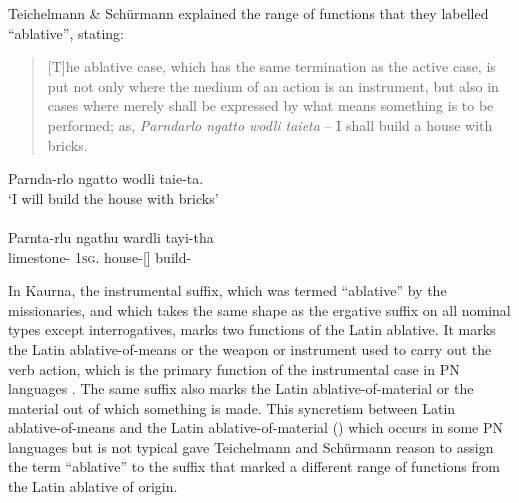 Teichelmann \& Schürmann explained the range of functions that they labelled “ablative”, stating: 

\begin{quote}
    [T]he ablative case, which has the same termination as the active case, is put not only where the medium of an action is an instrument, but also in cases where merely shall be expressed by what means something is to be performed; as, \textit{Parndarlo ngatto wodli taieta} – I shall build a house with bricks. \citep[24]{teichelmann_outlines_1840}
\end{quote}

\ea\label{ex:5:15}
Parnda-rlo 		ngatto 	  wodli                 taie-ta.  \\
`I will build the house with bricks' \\   	        
\citep[24]{teichelmann_outlines_1840} \\
\gll Parnta-rlu  		 ngathu     wardli              tayi-tha \\
limestone-   	1\textsc{sg}.   house-[]   build-                               \\
\z
      	         

      	         
In Kaurna, the instrumental suffix, which was termed “ablative” by the missionaries, and which takes the same shape as the ergative suffix on all nominal types except interrogatives, marks two functions of the Latin ablative. It marks the Latin ablative-of-means \citep[257--259]{gildersleeve_latin_1895} or the weapon or instrument used to carry out the verb action, which is the primary function of the instrumental case in PN languages \citep[135]{dixon_preface_2002}. The same suffix also marks the Latin ablative-of-material \citep[254--255]{gildersleeve_latin_1895} or the material out of which something is made. This syncretism between Latin ablative-of-means and the Latin ablative-of-material () which occurs in some PN languages but is not typical \citep[136]{dixon_preface_2002} gave Teichelmann and Schürmann reason to assign the term “ablative” to the suffix that marked a different range of functions from the Latin ablative of origin.


